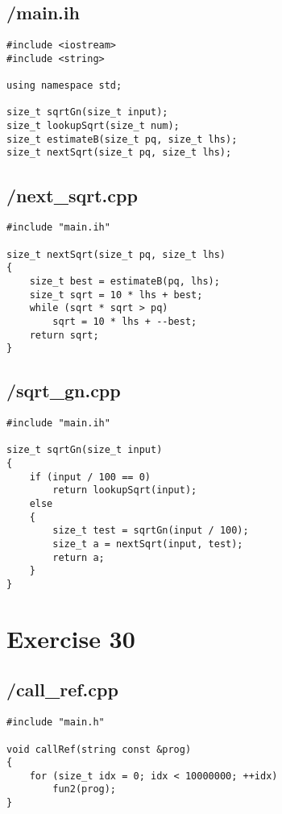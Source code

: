 \documentclass{article}
\begin{document}
\subsection*{/main.ih}
\begin{verbatim}
#include <iostream>
#include <string>

using namespace std;

size_t sqrtGn(size_t input);
size_t lookupSqrt(size_t num);
size_t estimateB(size_t pq, size_t lhs);
size_t nextSqrt(size_t pq, size_t lhs);
\end{verbatim}
\subsection*{/next\_sqrt.cpp}
\begin{verbatim}
#include "main.ih"

size_t nextSqrt(size_t pq, size_t lhs)
{
    size_t best = estimateB(pq, lhs);
    size_t sqrt = 10 * lhs + best;
    while (sqrt * sqrt > pq)
        sqrt = 10 * lhs + --best;
    return sqrt;
}

\end{verbatim}
\subsection*{/sqrt\_gn.cpp}
\begin{verbatim}
#include "main.ih"

size_t sqrtGn(size_t input)
{
    if (input / 100 == 0)
        return lookupSqrt(input);
    else
    {
        size_t test = sqrtGn(input / 100);
        size_t a = nextSqrt(input, test);
        return a;
    }
}
\end{verbatim}

\section*{Exercise 30}
\subsection*{/call\_ref.cpp}
\begin{verbatim}
#include "main.h"

void callRef(string const &prog)
{
    for (size_t idx = 0; idx < 10000000; ++idx)
        fun2(prog);
}
\end{verbatim}
\end{document}
